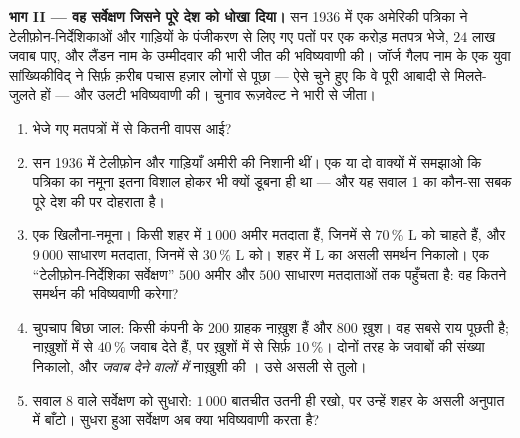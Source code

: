 \begin{problem}[{सप्ताहांत समस्या --- गिनती बनाम आवृत्ति, वह
सर्वेक्षण जिसने पूरे देश को धोखा दिया, और दो अस्पतालों का
विरोधाभास}]
\medskip
\noindent\textbf{भाग II --- वह सर्वेक्षण जिसने पूरे देश को धोखा
दिया।}
सन 1936 में एक अमेरिकी पत्रिका ने टेलीफ़ोन-निर्देशिकाओं और
गाड़ियों के पंजीकरण से लिए गए पतों पर एक करोड़ मतपत्र भेजे, $24$
लाख जवाब पाए, और लैंडन नाम के उम्मीदवार की भारी जीत की भविष्यवाणी
की। जॉर्ज गैलप नाम के एक युवा सांख्यिकीविद् ने सिर्फ़ क़रीब पचास
हज़ार लोगों से पूछा --- ऐसे चुने हुए कि वे पूरी आबादी से मिलते-जुलते
हों --- और उलटी भविष्यवाणी की। चुनाव रूज़वेल्ट ने भारी  से
जीता।
\begin{enumerate}[resume]
  \item भेजे गए मतपत्रों में से कितनी  वापस आई?
  \item सन 1936 में टेलीफ़ोन और गाड़ियाँ अमीरी की निशानी थीं। एक
        या दो वाक्यों में समझाओ कि पत्रिका का नमूना इतना विशाल
        होकर भी क्यों डूबना ही था --- और यह सवाल 1 का कौन-सा सबक
        पूरे देश की  पर दोहराता है।
  \item एक खिलौना-नमूना। किसी शहर में $1\,000$ अमीर मतदाता हैं,
        जिनमें से $70\,\%$ L को चाहते हैं, और $9\,000$ साधारण
        मतदाता, जिनमें से $30\,\%$ L को। शहर में L का असली समर्थन
        निकालो। एक ``टेलीफ़ोन-निर्देशिका सर्वेक्षण'' $500$ अमीर
        और $500$ साधारण मतदाताओं तक पहुँचता है: वह कितने समर्थन
        की भविष्यवाणी करेगा?
  \item चुपचाप बिछा जाल: किसी कंपनी के $200$ ग्राहक नाख़ुश हैं और
        $800$ ख़ुश। वह सबसे राय पूछती है; नाख़ुशों में से
        $40\,\%$ जवाब देते हैं, पर ख़ुशों में से सिर्फ़ $10\,\%$।
        दोनों तरह के जवाबों की संख्या निकालो, और
        \emph{जवाब देने वालों में} नाख़ुशी की । उसे असली
         से तुलो।
  \item सवाल 8 वाले सर्वेक्षण को सुधारो: $1\,000$ बातचीत उतनी ही
        रखो, पर उन्हें शहर के असली अनुपात में बाँटो। सुधरा हुआ
        सर्वेक्षण अब क्या भविष्यवाणी करता है?
\end{enumerate}


\end{problem}
